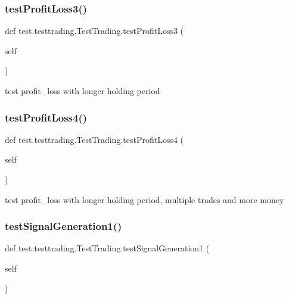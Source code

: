 \subsubsection{\texorpdfstring{test\+Profit\+Loss3()}{testProfitLoss3()}}
{\footnotesize\ttfamily def test.\+testtrading.\+Test\+Trading.\+test\+Profit\+Loss3 (\begin{DoxyParamCaption}\item[{}]{self }\end{DoxyParamCaption})}

\begin{DoxyVerb}test profit_loss with longer holding period\end{DoxyVerb}
 \mbox{\label{classtest_1_1testtrading_1_1TestTrading_af3110d4d491f6d1a4cc67916c6c189a2}} 
\subsubsection{\texorpdfstring{test\+Profit\+Loss4()}{testProfitLoss4()}}
{\footnotesize\ttfamily def test.\+testtrading.\+Test\+Trading.\+test\+Profit\+Loss4 (\begin{DoxyParamCaption}\item[{}]{self }\end{DoxyParamCaption})}

\begin{DoxyVerb}test profit_loss with longer holding period, multiple trades and more money\end{DoxyVerb}
 \mbox{\label{classtest_1_1testtrading_1_1TestTrading_a428be4083e5f6130022d680385742c37}} 
\subsubsection{\texorpdfstring{test\+Signal\+Generation1()}{testSignalGeneration1()}}
{\footnotesize\ttfamily def test.\+testtrading.\+Test\+Trading.\+test\+Signal\+Generation1 (\begin{DoxyParamCaption}\item[{}]{self }\end{DoxyParamCaption})}

